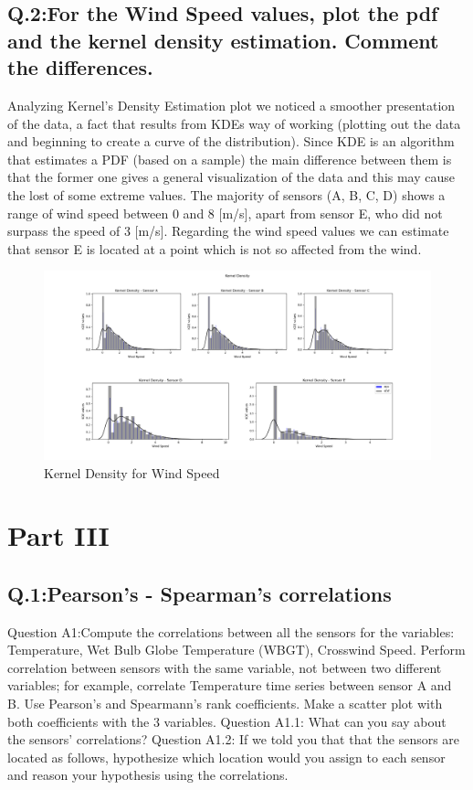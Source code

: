 \documentclass[a4paper]{article}
\begin{document}
        \subsection{Q.2:For the Wind Speed values, plot the pdf and the kernel density estimation. Comment the differences.}
        
            Analyzing Kernel’s Density Estimation plot we noticed a smoother presentation of the data, a fact that results from KDEs way of working (plotting out the data and beginning to create a curve of the distribution). Since KDE is an algorithm that estimates a PDF (based on a sample) the main difference between them is that the former one gives a general visualization of the data and this may cause the lost of some extreme values. The majority of sensors (A, B, C, D) shows a range of wind speed between 0 and 8 [m/s], apart from sensor E, who did not surpass the speed of 3 [m/s]. Regarding the wind speed values we can estimate that sensor E is located at a point which is not so affected from the wind. 
            \begin{figure}[H]
            \centering
                \includegraphics[width=\textwidth]{images/Kernel_Density.png}
                \caption{Kernel Density for Wind Speed}
                \label{fig:Kernel Density}
            \end{figure}

\section*{Part III}

        \subsection{Q.1:Pearson's - Spearman's correlations}
        Question A1:Compute the correlations between all the sensors for the variables: Temperature, Wet Bulb Globe Temperature (WBGT), Crosswind Speed. Perform correlation between sensors with the same variable, not between two different variables; for example, correlate Temperature time series between sensor A and B. Use Pearson’s and Spearmann’s rank coefficients. Make a scatter plot with both coefficients with the 3 variables.
        Question A1.1: What can you say about the sensors’ correlations?
        Question A1.2: If we told you that that the sensors are located as follows, hypothesize which location would you assign to each sensor and reason your hypothesis using the correlations.
\end{document}
